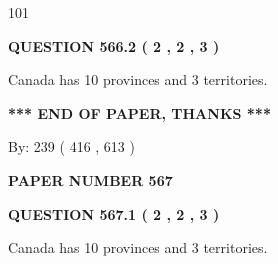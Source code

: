 \documentclass[12pt]{article}
\begin{document}
  
 
 
\noindent{}

101
 
 
  
\vspace{0.2in}
  
{\textbf{\Large{QUESTION
566.2 
 ( 2 , 2 , 3 )
}}}
  
  
 
 
\noindent{}
 
 
Canada has 10  provinces and 3 territories.
 
 
 
 
   
   
 \vspace{0.2in}
 
   
   
   
   
\vspace{1.0in} 
{\textbf{\large{ *** END OF PAPER, THANKS *** }}} 
   
   
\hspace{1.0in} By: 
 239 ( 416 ,  613 )
   
   
   
   
\newpage 
\setcounter{page}{ 
   567001 } 
   
   
   
   
 {\textbf{ \Large{ PAPER NUMBER  567  }}}
   
   
\vspace{0.2in}
   
   
   
   
   
   
 \vspace{0.2in}
 
 
 
 
   
   
  
\vspace{0.2in}
  
{\textbf{\Large{QUESTION
567.1 
 ( 2 , 2 , 3 )
}}}
  
  
 
 
\noindent{}
 
 
Canada has 10  provinces and 3 territories.
 
\end{document}
